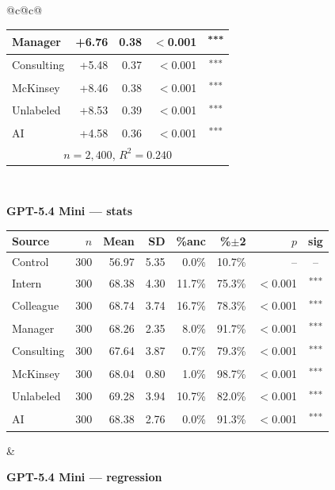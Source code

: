 \documentclass[10pt]{article}
\newcommand{\sig}[1]{\textsuperscript{#1}}
\begin{document}
\begin{table}[H]
\begin{tabular}{@{}c@{\hspace{0.5em}}c@{}}
\begin{minipage}[t]{0.49\textwidth}
\begin{tabular}{@{}l r r r c@{}}
Manager & +6.76 & 0.38 & $<$0.001 & \sig{***} \\
\midrule
Consulting & +5.48 & 0.37 & $<$0.001 & \sig{***} \\
McKinsey & +8.46 & 0.38 & $<$0.001 & \sig{***} \\
\midrule
Unlabeled & +8.53 & 0.39 & $<$0.001 & \sig{***} \\
AI & +4.58 & 0.36 & $<$0.001 & \sig{***} \\
\midrule
\multicolumn{5}{c}{\scriptsize $n=2{,}400$, $R^2=0.240$} \\
\bottomrule\end{tabular}
\end{minipage} \\[1.1em]
\begin{minipage}[t]{0.49\textwidth}\centering
\textbf{\footnotesize GPT-5.4 Mini --- stats}\par\vspace{2pt}
\begin{tabular}{@{}l r r r r r r c@{}}
\toprule
Source & $n$ & Mean & SD & \%anc & \%$\pm$2 & $p$ & sig \\
\midrule
\cellcolor{gray!22}Control & \cellcolor{gray!22}300 & \cellcolor{gray!22}56.97 & \cellcolor{gray!22}5.35 & \cellcolor{gray!22}0.0\% & \cellcolor{gray!22}10.7\% & \cellcolor{gray!22}-- & \cellcolor{gray!22}-- \\
\midrule
Intern & 300 & 68.38 & 4.30 & 11.7\% & 75.3\% & $<$0.001 & \sig{***} \\
Colleague & 300 & 68.74 & 3.74 & 16.7\% & 78.3\% & $<$0.001 & \sig{***} \\
Manager & 300 & 68.26 & 2.35 & 8.0\% & 91.7\% & $<$0.001 & \sig{***} \\
\midrule
Consulting & 300 & 67.64 & 3.87 & 0.7\% & 79.3\% & $<$0.001 & \sig{***} \\
McKinsey & 300 & 68.04 & 0.80 & 1.0\% & 98.7\% & $<$0.001 & \sig{***} \\
\midrule
Unlabeled & 300 & 69.28 & 3.94 & 10.7\% & 82.0\% & $<$0.001 & \sig{***} \\
AI & 300 & 68.38 & 2.76 & 0.0\% & 91.3\% & $<$0.001 & \sig{***} \\
\bottomrule\end{tabular}
\end{minipage} &
\begin{minipage}[t]{0.49\textwidth}\centering
\textbf{\footnotesize GPT-5.4 Mini --- regression}\par\vspace{2pt}
\begin{tabular}{@{}l r r r c@{}}

\end{tabular}
\end{minipage}
\end{tabular}
\end{table}
\end{document}
